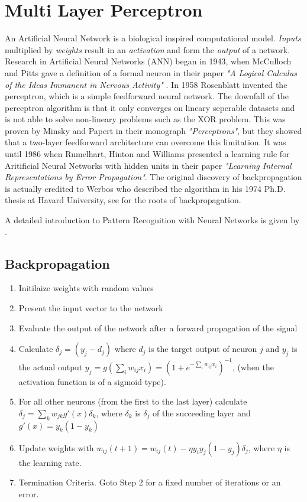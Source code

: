 \section{Multi Layer Perceptron}
An Artificial Neural Network is a biological inspired computational model. \textit{Inputs} multiplied by \textit{weights} result in an \textit{activation} and form the \textit{output} of a network. Research in Artificial Neural Networks (ANN) began in 1943, when McCulloch and Pitts gave a definition of a formal neuron in their paper \textit{"A Logical Calculus of the Ideas Immanent in Nervous Activity"} \cite{culloch1943}. In 1958 Rosenblatt invented the perceptron, which is a simple feedforward neural network. The downfall of the perceptron algorithm is that it only converges on lineary seperable datasets and is not able to solve non-lineary problems such as the XOR problem. This was proven by Minsky and Papert in their monograph \textit{"Perceptrons"}, but they showed that a two-layer feedforward architecture can overcome this limitation. It was until 1986 when Rumelhart, Hinton and Williams presented a learning rule for Aritificial Neural Networks with hidden units in their paper \textit{"Learning Internal Representations by Error Propagation"}. The original discovery of backpropagation is actually credited to Werbos who described the algorithm in his 1974 Ph.D. thesis at Havard University, see \cite{werbos1994} for the roots of backpropagation.

A detailed introduction to Pattern Recognition with Neural Networks is given by \cite{Bishop95}.

\subsection{Backpropagation}

\begin{enumerate}
 \item Initilaize weights with random values
 \item Present the input vector to the network
 \item Evaluate the output of the network after a forward propagation of the signal
 \item Calculate $\delta_j = (y_j - d_j)$ where $d_j$ is the target output of neuron $j$ and $y_j$ is the actual output $y_j = g(\sum_i{ w_{ij}x_i}) = (1 + e^{-\sum_i{w_{ij}x_i}})^{-1}$, (when the activation function is of a sigmoid type).
\item For all other neurons (from the first to the last layer) calculate $\delta_j = \sum_k{w_{jk} g'(x)\delta_k}$, where  $\delta_k$ is $\delta_j$ of the succeeding layer and $g'(x) = y_k(1-y_k)$
\item Update weights with $w_{ij}(t+1) = w_{ij}(t) - \eta y_i y_j(1-y_j) \delta_j$, where $\eta$ is the learning rate.
\item Termination Criteria. Goto Step 2 for a fixed number of iterations or an error.
\end{enumerate}

